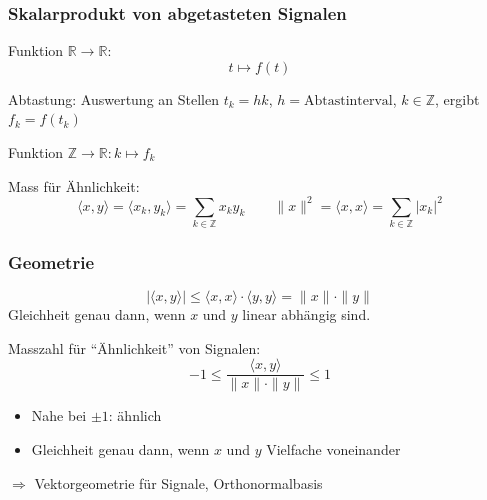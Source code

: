 
\begin{frame}
\frametitle{Skalarprodukt von abgetasteten Signalen}
\begin{signal}
Funktion $\mathbb R \to \mathbb R$:
\[
t\mapsto f(t)
\]
\end{signal}

Abtastung: Auswertung an Stellen $t_k = hk$, $h=\text{Abtastinterval}$,
$k\in\mathbb Z$, ergibt $f_k=f(t_k)$

\pause

\begin{abgetastet}
Funktion $\mathbb Z\to \mathbb R: k\mapsto f_k $
\end{abgetastet}

\pause

\begin{skalar}
Mass für Ähnlichkeit:
\[
\langle x,y\rangle
=
\langle x_k, y_k \rangle
=
\sum_{k\in\mathbb Z} x_ky_k
\qquad
\|x\|^2 = \langle x,x\rangle = \sum_{k\in\mathbb Z} |x_k|^2
\]
\end{skalar}

\end{frame}

%
%
\begin{frame}
\frametitle{Geometrie}
\begin{cauchyschwarz}
\[
|\langle x,y\rangle| \le \langle x,x\rangle \cdot \langle y,y\rangle
= \|x\|\cdot \|y\|
\]
Gleichheit genau dann, wenn $x$ und $y$ linear abhängig sind.
\end{cauchyschwarz}

\pause
Masszahl für ``Ähnlichkeit'' von Signalen:
\[
-1 \le \frac{\langle x,y\rangle}{\|x\|\cdot \|y\|}\le 1
\]
\begin{itemize}
\item
Nahe bei $\pm 1$: ähnlich
\item
Gleichheit genau dann, wenn $x$ und $y$ Vielfache voneinander
\end{itemize}
$\Rightarrow$ Vektorgeometrie für Signale, Orthonormalbasis
\end{frame}

